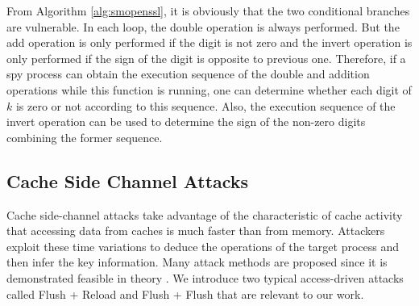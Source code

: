 From Algorithm \ref{alg:smopenssl}, it is obviously that the two conditional branches are vulnerable.
In each loop, the double operation is always performed.
But the add operation is only performed if the digit is not zero and the invert operation is only performed if the sign of the digit is opposite to previous one.
Therefore, if a spy process can obtain the execution sequence of
  the double and addition operations while this function is running,
one can determine whether each digit of $k$ is zero or not according to this sequence.
Also,  the execution sequence of the invert operation can be used to determine the sign of the non-zero digits combining the former sequence.



\subsection{Cache Side Channel Attacks}
\label{intro_cacheattack}
Cache side-channel attacks take advantage of the characteristic of cache activity
 that accessing data from caches is much faster than from memory.
Attackers exploit these time variations to deduce the operations of the target process and then infer the key information.
%
Many attack methods are proposed \cite{Bonneau2006, Bernstein2005Cache, Osvik2006, cachegame2011, flushreload}
 since it is demonstrated feasible in theory \cite{Page2002}.
We introduce two typical access-driven attacks called Flush + Reload \cite{flushreload} and Flush + Flush \cite{gruss2016flush} that are relevant to our work.

